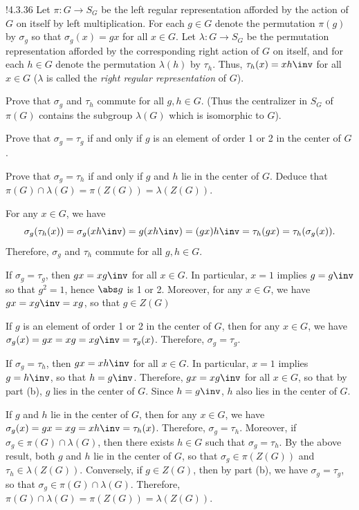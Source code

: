 \begin{exercise}!{4.3.36}
	Let $\pi \colon G \to S_G$ be the left regular representation afforded by the action of $G$ on itself by left multiplication.
	For each $g \in G$ denote the permutation $\pi(g)$ by $\sigma_g$ so that $\sigma_g(x) = gx$ for all $x \in G$.
	Let $\lambda \colon G \to S_G$ be the permutation representation afforded by the corresponding right action of $G$ on itself, and for each $h \in G$ denote the permutation $\lambda(h)$ by $\tau_h$.
	Thus, $\tau_h(x) = xh\inv$ for all $x \in G$ ($\lambda$ is called the \emph{right regular representation} of $G$).
	\begin{subexercises}
		\item Prove that $\sigma_g$ and $\tau_h$ commute for all $g, h \in G$. (Thus the centralizer in $S_G$ of $\pi(G)$ contains the subgroup $\lambda(G)$ which is isomorphic to $G$).
		\item Prove that $\sigma_g = \tau_g$ if and only if $g$ is an element of order 1 or 2 in the center of $G$.
		\item Prove that $\sigma_g = \tau_h$ if and only if $g$ and $h$ lie in the center of $G$.
	Deduce that $\pi(G) \cap \lambda(G) = \pi(Z(G)) = \lambda(Z(G))$.
	\end{subexercises}
\end{exercise}

\begin{solenum}
	\item For any $x \in G$, we have
	\[
		\sigma_g(\tau_h(x)) = \sigma_g(xh\inv) = g(xh\inv) = (gx)h\inv = \tau_h(gx) = \tau_h(\sigma_g(x)).
	\]
	Therefore, $\sigma_g$ and $\tau_h$ commute for all $g, h \in G$.
	\item If $\sigma_g = \tau_g$, then $gx = xg\inv$ for all $x \in G$.
	In particular, $x = 1$ implies $g = g\inv$ so that $g^2 = 1$, hence $\abs g$ is 1 or 2.
	Moreover, for any $x \in G$, we have $gx = xg\inv = xg$, so that $g \in Z(G)$
	
	If $g$ is an element of order 1 or 2 in the center of $G$, then for any $x \in G$, we have $\sigma_g(x) = gx = xg = xg\inv = \tau_g(x)$.
	Therefore, $\sigma_g = \tau_g$.
	\item If $\sigma_g = \tau_h$, then $gx = xh\inv$ for all $x \in G$.
	In particular, $x = 1$ implies $g = h\inv$, so that $h = g\inv$.
	Therefore, $gx = xg\inv$ for all $x \in G$, so that by part (b), $g$ lies in the center of $G$.
	Since $h = g\inv$, $h$ also lies in the center of $G$.
	
	If $g$ and $h$ lie in the center of $G$, then for any $x \in G$, we have $\sigma_g(x) = gx = xg = xh\inv = \tau_h(x)$.
	Therefore, $\sigma_g = \tau_h$.
	Moreover, if $\sigma_g \in \pi(G) \cap \lambda(G)$, then there exists $h \in G$ such that $\sigma_g = \tau_h$.
	By the above result, both $g$ and $h$ lie in the center of $G$, so that $\sigma_g \in \pi(Z(G))$ and $\tau_h \in \lambda(Z(G))$.
	Conversely, if $g \in Z(G)$, then by part (b), we have $\sigma_g = \tau_g$, so that $\sigma_g \in \pi(G) \cap \lambda(G)$.
	Therefore, $\pi(G) \cap \lambda(G) = \pi(Z(G)) = \lambda(Z(G))$.
\end{solenum}